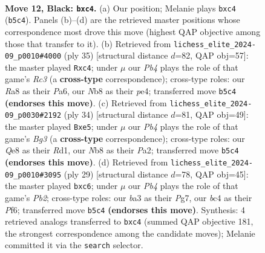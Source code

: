 \documentclass[11pt]{article}
\begin{document}
\clearpage

\begin{figure}[p]\centering
\begin{subfigure}{0.46\textwidth}\centering
\resizebox{\linewidth}{!}{%
\newchessgame
\chessboard[
  setfen={rn2qrk1/p1p1pp1p/5bp1/1p1P4/2B1P3/B1PQ3P/P4P1P/R3K2R b KQ - 1 12},
  showmover=false,
  pgfstyle=straightmove, color=movearrow, markmove={b5-c4}
]}
\caption{}
\end{subfigure}\hfill
\begin{subfigure}{0.46\textwidth}\centering
\resizebox{\linewidth}{!}{%
\newchessgame
\chessboard[
  setfen={3q1rk1/4bppp/p1rp4/1p2p1P1/2B1P2P/2P1B3/PP1Q1P2/R3K2R b KQ - 0 18},
  showmover=false,
  pgfstyle=straightmove, color=movearrow, markmove={c6-c4}
]}
\caption{}
\end{subfigure}
\\[4pt]
\begin{subfigure}{0.46\textwidth}\centering
\resizebox{\linewidth}{!}{%
\newchessgame
\chessboard[
  setfen={r1br2k1/ppq2pp1/2p4p/2P1bp2/3P4/6B1/PP2QPPP/R2R2K1 w - - 0 18},
  showmover=false,
  pgfstyle=straightmove, color=movearrow, markmove={g3-e5}
]}
\caption{}
\end{subfigure}\hfill
\begin{subfigure}{0.46\textwidth}\centering
\resizebox{\linewidth}{!}{%
\newchessgame
\chessboard[
  setfen={r2q1rk1/ppp3pp/1bB2p2/3pP3/3P4/2P1BP1P/P1Q2P2/R3K2R b KQ - 0 15},
  showmover=false,
  pgfstyle=straightmove, color=movearrow, markmove={b7-c6}
]}
\caption{}
\end{subfigure}
\caption{\textbf{Move 12, Black: \texttt{bxc4}.} (a) Our position; Melanie plays \texttt{bxc4} (\texttt{b5c4}). Panels (b)--(d) are the retrieved master positions whose correspondence most drove this move (highest QAP objective among those that transfer to it). (b) Retrieved from \texttt{lichess\_elite\_2024-09\_p0010\#4000} (ply 35) [structural distance $d$=82, QAP obj=57]: the master played \texttt{Rxc4}; under $\mu$ our \emph{Pb4} plays the role of that game's \emph{Rc3} (a \textbf{cross-type} correspondence); cross-type roles: our \emph{R}a8 as their \emph{P}a6, our \emph{N}b8 as their \emph{p}e4; transferred move \texttt{b5c4} \textbf{(endorses this move)}. (c) Retrieved from \texttt{lichess\_elite\_2024-09\_p0030\#2192} (ply 34) [structural distance $d$=81, QAP obj=49]: the master played \texttt{Bxe5}; under $\mu$ our \emph{Pb4} plays the role of that game's \emph{Bg3} (a \textbf{cross-type} correspondence); cross-type roles: our \emph{Q}e8 as their \emph{R}d1, our \emph{N}b8 as their \emph{P}a2; transferred move \texttt{b5c4} \textbf{(endorses this move)}. (d) Retrieved from \texttt{lichess\_elite\_2024-09\_p0010\#3095} (ply 29) [structural distance $d$=78, QAP obj=45]: the master played \texttt{bxc6}; under $\mu$ our \emph{Pb4} plays the role of that game's \emph{Pb2}; cross-type roles: our \emph{b}a3 as their \emph{P}g7, our \emph{b}c4 as their \emph{P}f6; transferred move \texttt{b5c4} \textbf{(endorses this move)}. Synthesis: 4 retrieved analogs transferred to \texttt{bxc4} (summed QAP objective 181, the strongest correspondence among the candidate moves); Melanie committed it via the \texttt{search} selector.}
\label{fig:thought-m23}
\end{figure}
\end{document}
